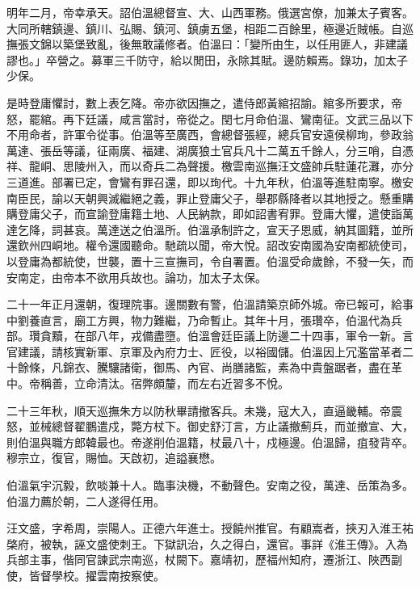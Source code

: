 \begin{pinyinscope}
明年二月，帝幸承天。詔伯溫總督宣、大、山西軍務。俄選宮僚，加兼太子賓客。大同所轄鎮邊、鎮川、弘賜、鎮河、鎮虜五堡，相距二百餘里，極邊近賊帳。自巡撫張文錦以築堡致亂，後無敢議修者。伯溫曰：「變所由生，以任用匪人，非建議謬也。」卒營之。募軍三千防守，給以閒田，永除其賦。邊防賴焉。錄功，加太子少保。

是時登庸懼討，數上表乞降。帝亦欲因撫之，遣侍郎黃綰招諭。綰多所要求，帝怒，罷綰。再下廷議，咸言當討，帝從之。閏七月命伯溫、鸞南征。文武三品以下不用命者，許軍令從事。伯溫等至廣西，會總督張經，總兵官安遠侯柳珣，參政翁萬達、張岳等議，征兩廣、福建、湖廣狼土官兵凡十二萬五千餘人，分三哨，自憑祥、龍峒、思陵州入，而以奇兵二為聲援。檄雲南巡撫汪文盛帥兵駐蓮花灘，亦分三道進。部署已定，會鸞有罪召還，即以珣代。十九年秋，伯溫等進駐南寧。檄安南臣民，諭以天朝興滅繼絕之義，罪止登庸父子，舉郡縣降者以其地授之。懸重購購登庸父子，而宣諭登庸籍土地、人民納款，即如詔書宥罪。登庸大懼，遣使詣萬達乞降，詞甚哀。萬達送之伯溫所。伯溫承制許之，宣天子恩威，納其圖籍，並所還欽州四峒地。權令還國聽命。馳疏以聞，帝大悅。詔改安南國為安南都統使司，以登庸為都統使，世襲，置十三宣撫司，令自署置。伯溫受命歲餘，不發一矢，而安南定，由帝本不欲用兵故也。論功，加太子太保。

二十一年正月還朝，復理院事。邊關數有警，伯溫請築京師外城。帝已報可，給事中劉養直言，廟工方興，物力難繼，乃命暫止。其年十月，張瓚卒，伯溫代為兵部。瓚貪黷，在部八年，戎備盡墮。伯溫會廷臣議上防邊二十四事，軍令一新。言官建議，請核實新軍、京軍及內府力士、匠役，以裕國儲。伯溫因上冗濫當革者二十餘條，凡錦衣、騰驤諸衛，御馬、內官、尚膳諸監，素為中貴盤踞者，盡在革中。帝稱善，立命清汰。宿弊頗釐，而左右近習多不悅。

二十三年秋，順天巡撫朱方以防秋畢請撤客兵。未幾，寇大入，直逼畿輔。帝震怒，並械總督翟鵬遣戍，斃方杖下。御史舒汀言，方止議撤薊兵，而並撤宣、大，則伯溫與職方郎韓最也。帝遂削伯溫籍，杖最八十，戍極邊。伯溫歸，疽發背卒。穆宗立，復官，賜恤。天啟初，追謚襄懋。

伯溫氣宇沉毅，飲啖兼十人。臨事決機，不動聲色。安南之役，萬達、岳策為多。伯溫力薦於朝，二人遂得任用。

汪文盛，字希周，崇陽人。正德六年進士。授饒州推官。有顧嵩者，挾刃入淮王祐棨府，被執，誣文盛使刺王。下獄訊治，久之得白，還官。事詳《淮王傳》。入為兵部主事，偕同官諫武宗南巡，杖闕下。嘉靖初，歷福州知府，遷浙江、陜西副使，皆督學校。擢雲南按察使。


\end{pinyinscope}
